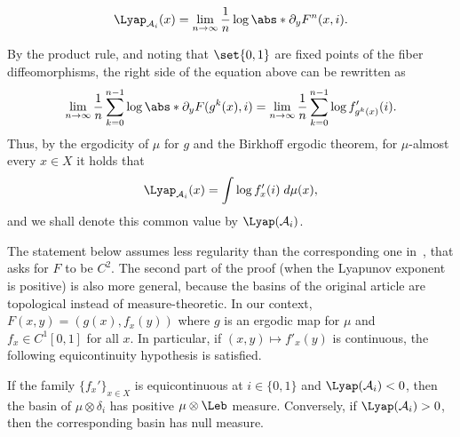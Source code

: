 \documentclass[../main]{subfiles}
\begin{document}
\begin{definition}
  \begin{equation*}
    \Lyap_{\mathcal{A}_i}(x) = \lim_{n \to \infty}\frac{1}{n} \log \abs*{ \partial_y F^{n}(x,i) }.
  \end{equation*}
\end{definition}
By the product rule, and noting that \(\set{0,1}\) are fixed points of the fiber diffeomorphisms, the right side of the equation above can be rewritten as
\begin{equation*}
  \lim_{n \to \infty}\frac{1}{n} \sum_{k = 0}^{n - 1} \log \abs*{\partial_y F(g^k(x),i)}
  = \lim_{n \to \infty}\frac{1}{n} \sum_{k = 0}^{n - 1} \log f_{g^k(x)}'(i).
\end{equation*}
Thus, by the ergodicity of \(\mu\)  for \(g\) and the Birkhoff ergodic theorem,  for \(\mu\)-almost every \(x \in X\) it holds that
\begin{equation}\label{eq:trav-lyap}
  \Lyap_{\mathcal{A}_i}(x) = \int \log f_{x}'(i) \;d \mu(x),
\end{equation}
and we shall denote this common value by \(\Lyap(\mathcal{A}_i)\).

The statement below assumes less regularity than the corresponding one in~\cite[lemma A.1]{bonifantSchwarzianDerivativesCylinder2008}, that asks for \(F\) to be \(C^2\). The second part of the proof (when the Lyapunov exponent is positive) is also more general, because the basins of the original article are topological instead of measure-theoretic. In our context, \(F(x,y) = (g(x),f_x(y))\) where \(g\) is an ergodic map for \(\mu\) and \(f_x \in C^1[0,1]\) for all \(x\). In particular, if \((x,y) \mapsto f'_x(y)\) is continuous, the following equicontinuity hypothesis is satisfied. 
\begin{lemma}\label{lem:lyap-basin-posmeas}
  If the family \(\{ f_x' \}_{x \in X}\) is equicontinuous at \(i \in \{ 0,1 \}\) and \(\Lyap(\mathcal{A}_i) < 0\), then the basin of \(\mu \otimes \delta_i\) has positive \(\mu \otimes \Leb\) measure.  Conversely, if \(\Lyap(\mathcal{A}_i) > 0\), then the corresponding basin has null measure.
\end{lemma}
\end{document}
